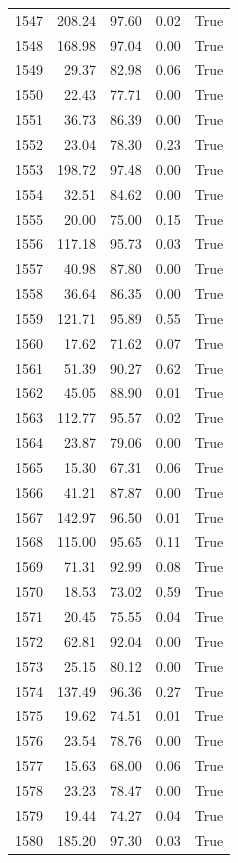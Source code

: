 \begin{longtable}{rrrrr}
1547 & 208.24 & 97.60 & 0.02 & True \\
1548 & 168.98 & 97.04 & 0.00 & True \\
1549 & 29.37 & 82.98 & 0.06 & True \\
1550 & 22.43 & 77.71 & 0.00 & True \\
1551 & 36.73 & 86.39 & 0.00 & True \\
1552 & 23.04 & 78.30 & 0.23 & True \\
1553 & 198.72 & 97.48 & 0.00 & True \\
1554 & 32.51 & 84.62 & 0.00 & True \\
1555 & 20.00 & 75.00 & 0.15 & True \\
1556 & 117.18 & 95.73 & 0.03 & True \\
1557 & 40.98 & 87.80 & 0.00 & True \\
1558 & 36.64 & 86.35 & 0.00 & True \\
1559 & 121.71 & 95.89 & 0.55 & True \\
1560 & 17.62 & 71.62 & 0.07 & True \\
1561 & 51.39 & 90.27 & 0.62 & True \\
1562 & 45.05 & 88.90 & 0.01 & True \\
1563 & 112.77 & 95.57 & 0.02 & True \\
1564 & 23.87 & 79.06 & 0.00 & True \\
1565 & 15.30 & 67.31 & 0.06 & True \\
1566 & 41.21 & 87.87 & 0.00 & True \\
1567 & 142.97 & 96.50 & 0.01 & True \\
1568 & 115.00 & 95.65 & 0.11 & True \\
1569 & 71.31 & 92.99 & 0.08 & True \\
1570 & 18.53 & 73.02 & 0.59 & True \\
1571 & 20.45 & 75.55 & 0.04 & True \\
1572 & 62.81 & 92.04 & 0.00 & True \\
1573 & 25.15 & 80.12 & 0.00 & True \\
1574 & 137.49 & 96.36 & 0.27 & True \\
1575 & 19.62 & 74.51 & 0.01 & True \\
1576 & 23.54 & 78.76 & 0.00 & True \\
1577 & 15.63 & 68.00 & 0.06 & True \\
1578 & 23.23 & 78.47 & 0.00 & True \\
1579 & 19.44 & 74.27 & 0.04 & True \\
1580 & 185.20 & 97.30 & 0.03 & True \\

\end{longtable}
